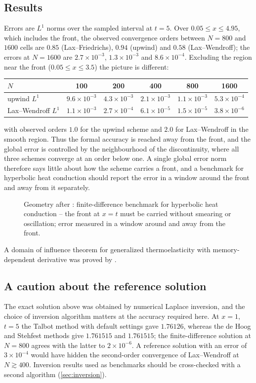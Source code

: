 \subsection{Results}
Errors are $L^1$ norms over the sampled interval at $t=5$. Over $0.05\le x\le4.95$, which includes the front, the observed convergence orders between $N=800$ and $1600$ cells are $0.85$ (Lax--Friedrichs), $0.94$ (upwind) and $0.58$ (Lax--Wendroff); the errors at $N=1600$ are $2.7\times10^{-3}$, $1.3\times10^{-3}$ and $8.6\times10^{-4}$. Excluding the region near the front ($0.05\le x\le3.5$) the picture is different:
\begin{center}
\begin{tabular}{@{}lccccc@{}}\toprule
$N$ & 100 & 200 & 400 & 800 & 1600\\\midrule
upwind $L^1$ & $9.6\times10^{-3}$ & $4.3\times10^{-3}$ & $2.1\times10^{-3}$ & $1.1\times10^{-3}$ & $5.3\times10^{-4}$\\
Lax--Wendroff $L^1$ & $1.1\times10^{-3}$ & $2.7\times10^{-4}$ & $6.1\times10^{-5}$ & $1.5\times10^{-5}$ & $3.8\times10^{-6}$\\
\bottomrule\end{tabular}
\end{center}
with observed orders $1.0$ for the upwind scheme and $2.0$ for Lax--Wendroff in the smooth region. Thus the formal accuracy is reached away from the front, and the global error is controlled by the neighbourhood of the discontinuity, where all three schemes converge at an order below one. A single global error norm therefore says little about how the scheme carries a front, and a benchmark for hyperbolic heat conduction should report the error in a window around the front and away from it separately.

\begin{figure}[t!]\centering\small

\caption{Geometry after \citep{Joseph1990}: finite-difference benchmark for hyperbolic heat conduction -- the front at $x=t$ must be carried without smearing or oscillation; error measured in a window around and away from the front.}\label{fig:schemes-geo}
\end{figure}

A domain of influence theorem for generalized thermoelasticity with memory-dependent derivative was proved by \citep{Sarkar2019a}.

\subsection{A caution about the reference solution}
The exact solution above was obtained by numerical Laplace inversion, and the choice of inversion algorithm matters at the accuracy required here. At $x=1$, $t=5$ the Talbot method with default settings gave $1.76126$, whereas the de Hoog and Stehfest methods give $1.761515$ and $1.761515$; the finite-difference solution at $N=800$ agrees with the latter to $2\times10^{-6}$. A reference solution with an error of $3\times10^{-4}$ would have hidden the second-order convergence of Lax--Wendroff at $N\gtrsim400$. Inversion results used as benchmarks should be cross-checked with a second algorithm (\cref{sec:inversion}).

